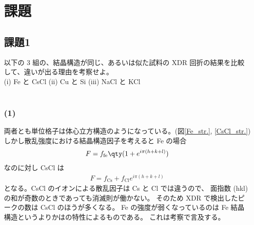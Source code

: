 \documentclass[11pt,dvipdfmx,a4paper]{jsarticle}
\begin{document}
\section{課題}
\subsection*{課題1}
以下の 3 組の、結晶構造が同じ、あるいは似た試料の XDR 回折の結果を比較して、違いが出る理由を考察せよ。\\
(i) Fe と CsCl \quad (ii) Cu と Si \quad (iii) NaCl と KCl\\ \\

\subsubsection*{(1)}
両者とも単位格子は体心立方構造のようになっている。(図\ref{Fe_str.}, \ref{CsCl_str.})
しかし散乱強度における結晶構造因子を考えると Fe の場合
\begin{align}
	F = f_{\text{fe}}\qty(1+e^{i\pi(h+k+l)})
\end{align}
なのに対し CsCl は
\begin{align}
	F = f_{\text{Cs}}+f_{\text{Cl}}e^{i\pi(h+k+l)}
\end{align}
となる。CsCl のイオンによる散乱因子は Cs と Cl では違うので、
面指数 (hkl) の和が奇数のときであっても消滅則が働かない。
そのため XDR で検出したピークの数は CsCl のほうが多くなる。%
Fe の強度が弱くなっているのは Fe 結晶構造というよりかはの特性によるものである。
これは考察で言及する。\\ %

\end{document}
